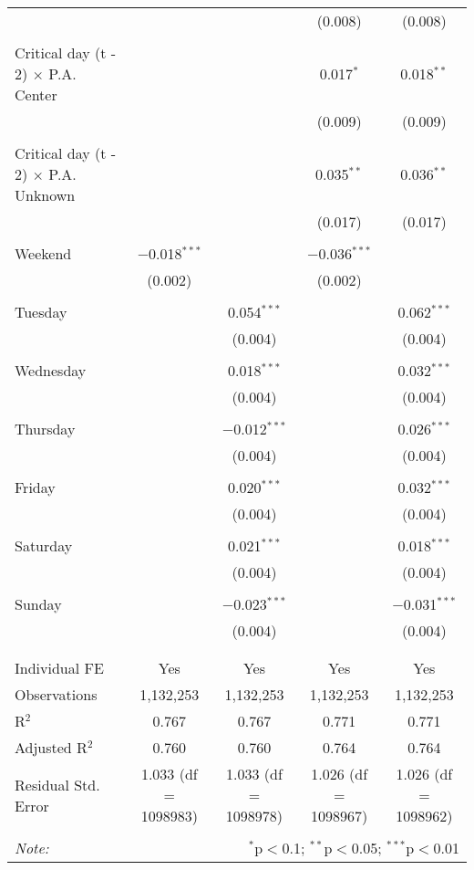 \documentclass[
]{article}
\begin{document}
\begin{table}[!htbp]
{\begin{tabular}{@{\extracolsep{5pt}}lcccc}
  &  &  & (0.008) & (0.008) \\ 
  & & & & \\ 
 Critical day (t - 2) $\times$ P.A. Center &  &  & 0.017$^{*}$ & 0.018$^{**}$ \\ 
  &  &  & (0.009) & (0.009) \\ 
  & & & & \\ 
 Critical day (t - 2) $\times$ P.A. Unknown &  &  & 0.035$^{**}$ & 0.036$^{**}$ \\ 
  &  &  & (0.017) & (0.017) \\ 
  & & & & \\ 
 Weekend & $-$0.018$^{***}$ &  & $-$0.036$^{***}$ &  \\ 
  & (0.002) &  & (0.002) &  \\ 
  & & & & \\ 
 Tuesday &  & 0.054$^{***}$ &  & 0.062$^{***}$ \\ 
  &  & (0.004) &  & (0.004) \\ 
  & & & & \\ 
 Wednesday &  & 0.018$^{***}$ &  & 0.032$^{***}$ \\ 
  &  & (0.004) &  & (0.004) \\ 
  & & & & \\ 
 Thursday &  & $-$0.012$^{***}$ &  & 0.026$^{***}$ \\ 
  &  & (0.004) &  & (0.004) \\ 
  & & & & \\ 
 Friday &  & 0.020$^{***}$ &  & 0.032$^{***}$ \\ 
  &  & (0.004) &  & (0.004) \\ 
  & & & & \\ 
 Saturday &  & 0.021$^{***}$ &  & 0.018$^{***}$ \\ 
  &  & (0.004) &  & (0.004) \\ 
  & & & & \\ 
 Sunday &  & $-$0.023$^{***}$ &  & $-$0.031$^{***}$ \\ 
  &  & (0.004) &  & (0.004) \\ 
  & & & & \\ 
\hline \\[-1.8ex] 
Individual FE & Yes & Yes & Yes & Yes \\ 
Observations & 1,132,253 & 1,132,253 & 1,132,253 & 1,132,253 \\ 
R$^{2}$ & 0.767 & 0.767 & 0.771 & 0.771 \\ 
Adjusted R$^{2}$ & 0.760 & 0.760 & 0.764 & 0.764 \\ 
Residual Std. Error & 1.033 (df = 1098983) & 1.033 (df = 1098978) & 1.026 (df = 1098967) & 1.026 (df = 1098962) \\ 
\hline 
\hline \\[-1.8ex] 
\textit{Note:}  & \multicolumn{4}{r}{$^{*}$p$<$0.1; $^{**}$p$<$0.05; $^{***}$p$<$0.01} \\ 
\end{tabular}
} 
\end{table} 
\newpage
\end{document}
